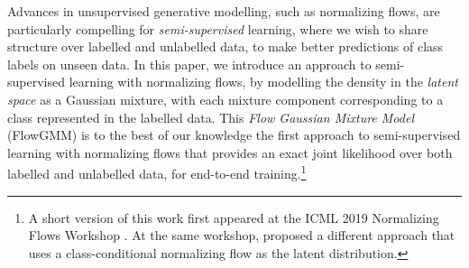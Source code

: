 \documentclass{article}
\newcommand{\method}{FlowGMM\xspace}
\begin{document}
\begin{figure*}
\caption{
        Illustration of semi-supervised learning with \method on a binary classification problem. 
        Colors represent the two classes or the corresponding Gaussian mixture components.
        Labeled data are shown with triangles, colored by the corresponding class label, and 
        blue dots represent unlabeled data.
        \textbf{(a):} Data distribution and the classifier decision boundary.
        \textbf{(b):} The learned mapping of the data to the latent space.  
        \textbf{(c):} Samples from the Gaussian mixture in the latent space.
        \textbf{(d):} Samples from the model in the data space.
    }
	\label{fig:intro}
\end{figure*}

Advances in unsupervised generative modelling, such as normalizing flows, are particularly compelling for
\emph{semi-supervised} learning, where we wish to share structure over labelled and unlabelled data, to make better predictions of class labels on unseen data. In this paper, we introduce an approach to semi-supervised learning with normalizing flows, by modelling the density in the \emph{latent space} as a Gaussian mixture, with each mixture component corresponding to a class represented in the labelled data. This \emph{Flow Gaussian Mixture Model} (\method) is to the best of our knowledge the first approach to semi-supervised learning with normalizing flows that provides an exact joint likelihood over both labelled and unlabelled data, for end-to-end training.\footnote{A short version of this work first appeared at the ICML 2019 Normalizing Flows Workshop \citep{izmailov2019semi}. At the same workshop, \citet{atanov2019semi} proposed a different approach that uses a class-conditional normalizing flow as the latent distribution.}
\end{document}
